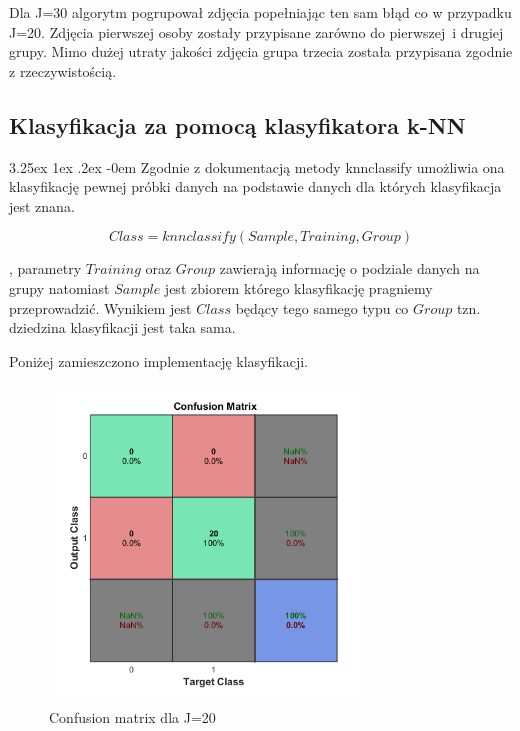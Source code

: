 \documentclass[11pt, a4paper]{article}
\makeatletter
\newcommand{\fbi}{\leavevmode{\parindent=1em\indent}}
\renewcommand\paragraph{\@startsection{paragraph}{5}{\z@}
  {3.25ex \@plus1ex \@minus.2ex}
  {-0em}
  {\normalfont\normalsize\bfseries}}
\makeatother
\begin{document}
\fbi
Dla J=30 algorytm pogrupował zdjęcia popełniając ten sam błąd co w przypadku J=20. Zdjęcia pierwszej osoby zostały przypisane zarówno do pierwszej~i drugiej grupy. Mimo dużej utraty jakości zdjęcia grupa trzecia została przypisana zgodnie z rzeczywistością.

\subsection{Klasyfikacja za pomocą klasyfikatora k-NN}
\paragraph{}
Zgodnie z dokumentacją metody knnclassify \cite{test3} umożliwia ona klasyfikację pewnej próbki danych na podstawie danych dla których klasyfikacja jest znana.

\begin{equation}\label{eq:knnclasify}
Class = knnclassify(Sample, Training, Group)
\end{equation}

, parametry $Training$ oraz $Group$ zawierają informację o podziale danych na grupy natomiast $Sample$ jest zbiorem którego klasyfikację pragniemy przeprowadzić. Wynikiem jest $Class$ będący tego samego typu co $Group$ tzn. dziedzina klasyfikacji jest taka sama.

Poniżej zamieszczono implementację klasyfikacji.




\begin{figure}[H]
	\centering
	\includegraphics[width=0.75\textwidth]{./assets/ilustracja_zad2_conf_j20.png}
	\caption{Confusion matrix dla J=20}
	\label{fig:ilustracja_zad2_conf_j20}
\end{figure}
\end{document}
